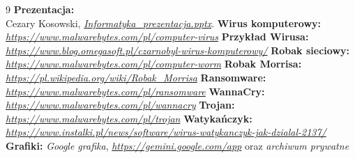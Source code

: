 
\begin{thebibliography}{9}
     \textbf{Prezentacja:}\\ Cezary Kosowski,              \textit{\href{Informatyka_prezentacja.pptx}{Informatyka\_prezentacja.pptx}}.
     \textbf{Wirus komputerowy:}\\ \textit{\url{https://www.malwarebytes.com/pl/computer-virus}}       
     \textbf{Przykład Wirusa:}\\ \textit{\url{https://www.blog.omegasoft.pl/czarnobyl-wirus-komputerowy/}}
     \textbf{Robak sieciowy:}\\ \textit{\url{https://www.malwarebytes.com/pl/computer-worm}}
     \textbf{Robak Morrisa:}\\ \textit{\url{https://pl.wikipedia.org/wiki/Robak_Morrisa}}         \textbf{Ransomware:}\\ \textit{\url{https://www.malwarebytes.com/pl/ransomware}}
     \textbf{WannaCry:}\\ \textit{\url{https://www.malwarebytes.com/pl/wannacry}}
     \textbf{Trojan:}\\ \textit{\url{https://www.malwarebytes.com/pl/trojan}}
     \textbf{Watykańczyk:}\\ \textit{\url{https://www.instalki.pl/news/software/wirus-watykanczyk-jak-dzialal-2137/}}
     \textbf{Grafiki:} \textit{Google grafika}, \textit{\url{https://gemini.google.com/app}} oraz \textit{archiwum prywatne}
\end{thebibliography}
